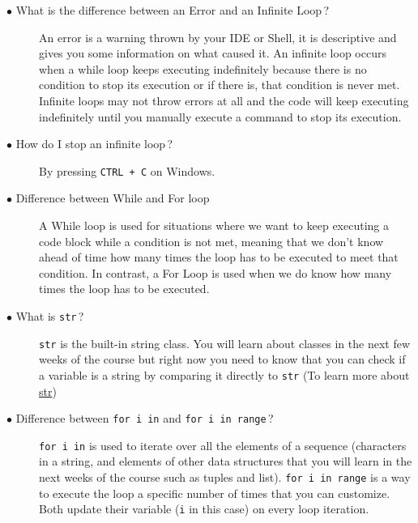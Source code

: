 \documentclass{article}
\newcommand{\inlinecode}[1]{\texttt{#1}}
\newcommand{\link}[2]{\textcolor{blue}{\href{#2}{#1}}}
\newcommand{\question}[1]{\item[$\bullet$ #1] \hfil}
\newenvironment{answer}{}{}
\newenvironment{faq}{\begin{description}}{\end{description}}
\begin{document}
\begin{faq}
				\question{What is the difference between an Error and an Infinite Loop\,?}
				
				\begin{answer}
					An error is a warning thrown by your IDE or Shell, it is descriptive and gives
					you some information on what caused it. An infinite loop occurs when a while
					loop keeps executing indefinitely because there is no condition to stop its
					execution or if there is, that condition is never met. Infinite loops may not
					throw errors at all and the code will keep executing indefinitely until you
					manually execute a command to stop its execution.
				\end{answer}
				
				\question{How do I stop an infinite loop\,?}
				
				\begin{answer}
					By pressing \texttt{CTRL + C} on Windows.
				\end{answer}
				
				\question{Difference between While and For loop}
				
				\begin{answer}
					A While loop is used for situations where we want to keep executing a code
					block while a condition is not met, meaning that we don't know ahead of time
					how many times the loop has to be executed to meet that condition. In
					contrast, a For Loop is used when we do know how many times the loop has
					to be executed.
				\end{answer}
				
				\question{What is \inlinecode{str}\,?}
				
				\begin{answer}
					\inlinecode{str} is the built-in string class. You will learn about classes in the next few
					weeks of the course but right now you need to know that you can check if a
					variable is a string by comparing it directly to \inlinecode{str} (To learn more about \link{str}{https://docs.python.org/3/library/functions.html\#func-str})
				\end{answer}
				
				\question{Difference between \inlinecode{for i in} and \inlinecode{for i in range}\,?}
				
				\begin{answer}
					\inlinecode{for i in} is used to iterate over all the elements of a sequence (characters in a
					string, and elements of other data structures that you will learn in the next
					weeks of the course such as tuples and list). \inlinecode{for i in range} is a way to
					execute the loop a specific number of times that you can customize. Both
					update their variable (\inlinecode{i} in this case) on every loop iteration.
				\end{answer}
				

\end{faq}
\end{document}
